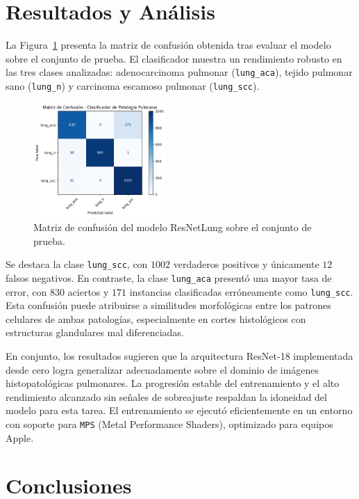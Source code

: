 \documentclass[conference]{IEEEtran}
\begin{document}
\section{Resultados y Análisis}

La Figura~\ref{fig:confmatrix} presenta la matriz de confusión obtenida tras evaluar el modelo sobre el conjunto de prueba. El clasificador muestra un rendimiento robusto en las tres clases analizadas: adenocarcinoma pulmonar (\texttt{lung\_aca}), tejido pulmonar sano (\texttt{lung\_n}) y carcinoma escamoso pulmonar (\texttt{lung\_scc}).

\begin{figure}[h]
\centering
\includegraphics[width=0.45\textwidth]{confusion_matrix.png}
\caption{Matriz de confusión del modelo ResNetLung sobre el conjunto de prueba.}
\label{fig:confmatrix}
\end{figure}

Se destaca la clase \texttt{lung\_scc}, con $1002$ verdaderos positivos y únicamente $12$ falsos negativos. En contraste, la clase \texttt{lung\_aca} presentó una mayor tasa de error, con $830$ aciertos y $171$ instancias clasificadas erróneamente como \texttt{lung\_scc}. Esta confusión puede atribuirse a similitudes morfológicas entre los patrones celulares de ambas patologías, especialmente en cortes histológicos con estructuras glandulares mal diferenciadas.

En conjunto, los resultados sugieren que la arquitectura ResNet-18 implementada desde cero logra generalizar adecuadamente sobre el dominio de imágenes histopatológicas pulmonares. La progresión estable del entrenamiento y el alto rendimiento alcanzado sin señales de sobreajuste respaldan la idoneidad del modelo para esta tarea. El entrenamiento se ejecutó eficientemente en un entorno con soporte para \texttt{MPS} (Metal Performance Shaders), optimizado para equipos Apple.

\section{Conclusiones}
\end{document}
